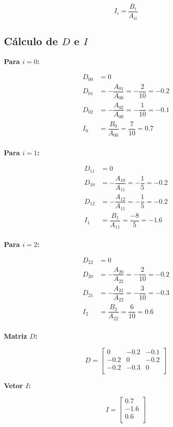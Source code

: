 \documentclass{article}
\begin{document}
\[
I_i = \dfrac{B_i}{A_{ii}}
\]

\subsection*{Cálculo de $D$ e $I$}

\textbf{Para $i = 0$:}

\begin{align*}
D_{00} &= 0 \\
D_{01} &= -\dfrac{A_{01}}{A_{00}} = -\dfrac{2}{10} = -0.2 \\
D_{02} &= -\dfrac{A_{02}}{A_{00}} = -\dfrac{1}{10} = -0.1 \\
I_0 &= \dfrac{B_0}{A_{00}} = \dfrac{7}{10} = 0.7 \\
\end{align*}

\textbf{Para $i = 1$:}

\begin{align*}
D_{11} &= 0 \\
D_{10} &= -\dfrac{A_{10}}{A_{11}} = -\dfrac{1}{5} = -0.2 \\
D_{12} &= -\dfrac{A_{12}}{A_{11}} = -\dfrac{1}{5} = -0.2 \\
I_1 &= \dfrac{B_1}{A_{11}} = \dfrac{-8}{5} = -1.6 \\
\end{align*}

\textbf{Para $i = 2$:}

\begin{align*}
D_{22} &= 0 \\
D_{20} &= -\dfrac{A_{20}}{A_{22}} = -\dfrac{2}{10} = -0.2 \\
D_{21} &= -\dfrac{A_{21}}{A_{22}} = -\dfrac{3}{10} = -0.3 \\
I_2 &= \dfrac{B_2}{A_{22}} = \dfrac{6}{10} = 0.6 \\
\end{align*}

\textbf{Matriz $D$:}

\[
D = \begin{bmatrix}
0 & -0.2 & -0.1 \\
-0.2 & 0 & -0.2 \\
-0.2 & -0.3 & 0 \\
\end{bmatrix}
\]

\textbf{Vetor $I$:}

\[
I = \begin{bmatrix}
0.7 \\
-1.6 \\
0.6 \\
\end{bmatrix}
\]
\end{document}
